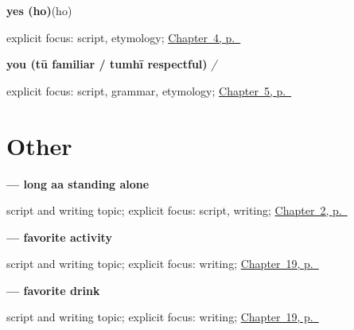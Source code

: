 \noindent\begin{minipage}[t]{\linewidth}
\raggedright
\textbf{yes (ho)}\enspace\emph{}\enspace(ho)\par
\footnotesize explicit focus: script, etymology; \hyperref[ch:greetings]{Chapter~4, p.~\pageref*{ch:greetings}}
\end{minipage}\par\smallskip

\noindent\begin{minipage}[t]{\linewidth}
\raggedright
\textbf{you (tū familiar / tumhī respectful)}\enspace\emph{ / }\par
\footnotesize explicit focus: script, grammar, etymology; \hyperref[ch:introductions]{Chapter~5, p.~\pageref*{ch:introductions}}
\end{minipage}\par\smallskip

\section*{Other}

\noindent\begin{minipage}[t]{\linewidth}
\raggedright
\textbf{ — long aa standing alone}\par
\footnotesize script and writing topic; explicit focus: script, writing; \hyperref[ch:thanks-script-a]{Chapter~2, p.~\pageref*{ch:thanks-script-a}}
\end{minipage}\par\smallskip

\noindent\begin{minipage}[t]{\linewidth}
\raggedright
\textbf{  — favorite activity}\par
\footnotesize script and writing topic; explicit focus: writing; \hyperref[ch:mr-a1-form-labels]{Chapter~19, p.~\pageref*{ch:mr-a1-form-labels}}
\end{minipage}\par\smallskip

\noindent\begin{minipage}[t]{\linewidth}
\raggedright
\textbf{  — favorite drink}\par
\footnotesize script and writing topic; explicit focus: writing; \hyperref[ch:mr-a1-form-labels]{Chapter~19, p.~\pageref*{ch:mr-a1-form-labels}}
\end{minipage}\par\smallskip

